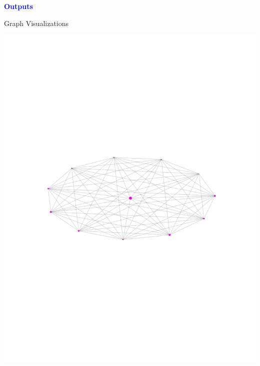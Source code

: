 \documentclass[landscape,paperwidth=70in,paperheight=46in,fontscale=0.225]{baposter} %
\begin{document}
\begin{poster}
{%

\begin{center}
\textcolor{blue}{\large\textbf{Outputs}}
\end{center}


Graph Visualizations

\begin{minipage}{0.3\linewidth}
\includegraphics[scale=0.3]{figures/graph_community.pdf} 

\end{minipage}
\hfill
\begin{minipage}{0.3\linewidth}


\end{minipage}}
\end{poster}
\end{document}
